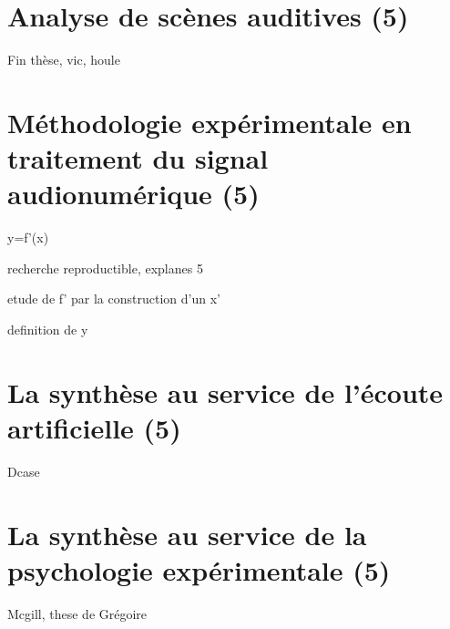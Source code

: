 \section{Analyse de scènes auditives (5)}

Fin thèse, vic, houle

\section{Méthodologie expérimentale en traitement du signal audionumérique (5)}

y=f'(x)

recherche reproductible, explanes 5

etude de f' par la construction d'un x'

definition de y

\section{La synthèse au service de l'écoute artificielle (5)}

Dcase

\section{La synthèse au service de la psychologie expérimentale (5)}

Mcgill, these de Grégoire
